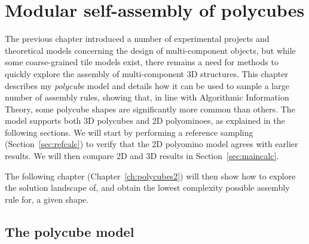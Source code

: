 \chapter{\label{ch:polycubes1}Modular self-assembly of polycubes}

\minitoc

The previous chapter introduced a number of experimental projects and theoretical models concerning the design of multi-component objects, but while some coarse-grained tile models exist, there remains a need for methods to quickly explore the assembly of multi-component 3D structures.
This chapter describes my \emph{polycube} model and details how it can be used to sample a large number of assembly rules, showing that, in line with Algorithmic Information Theory, some polycube shapes are significantly more common than others. The model supports both 3D polycubes and 2D polyominoes, as explained in the following sections. We will start by performing a reference sampling (Section~\ref{sec:refcalc}) to verify that the 2D polyomino model agrees with earlier results. We will then compare 2D and 3D results in Section~\ref{sec:maincalc}.

The following chapter (Chapter~\ref{ch:polycubes2}) will then show how to explore the solution landscape of, and obtain the lowest complexity possible assembly rule for, a given shape.

\section{The polycube model}

